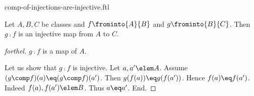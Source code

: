 \documentclass{naproche-library}
\begin{document}
\begin{smodule}[title=Compositions of Injections are Injective]{comp-of-injections-are-injective.ftl}


\begin{proposition}[forthel,id=CompOfInjectMapsIsInjectProp]
  Let $A, B, C$ be classes and $f \frominto{A}{B}$ and $g \frominto{B}{C}$.
  Then $g \comp f$ is an injective map from $A$ to $C$.
\end{proposition}
\begin{proof}[forthel]
  $g \comp f$ is a map of $A$.

  Let us show that $g \comp f$ is injective.
    Let $a, a' \elem A$.
    Assume $(g \comp f)(a) \eq (g \comp f)(a')$.
    Then $g(f(a)) \eq g(f(a'))$.
    Hence $f(a) \eq f(a')$.
    Indeed $f(a), f(a') \elem B$.
    Thus $a \eq a'$.
  End.
\end{proof}

\end{smodule}
\end{document}
